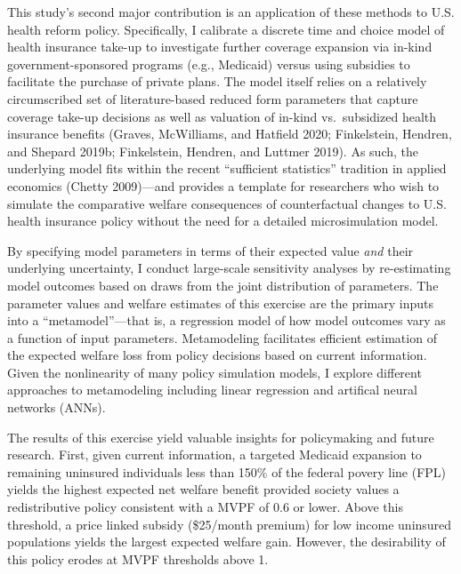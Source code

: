 \documentclass[
  10pt,
]{article}
\begin{document}
This study's second major contribution is an application of these
methods to U.S. health reform policy. Specifically, I calibrate a
discrete time and choice model of health insurance take-up to
investigate further coverage expansion via in-kind government-sponsored
programs (e.g., Medicaid) versus using subsidies to facilitate the
purchase of private plans. The model itself relies on a relatively
circumscribed set of literature-based reduced form parameters that
capture coverage take-up decisions as well as valuation of in-kind
vs.~subsidized health insurance benefits (Graves, McWilliams, and
Hatfield 2020; Finkelstein, Hendren, and Shepard 2019b; Finkelstein,
Hendren, and Luttmer 2019). As such, the underlying model fits within
the recent ``sufficient statistics'' tradition in applied economics
(Chetty 2009)---and provides a template for researchers who wish to
simulate the comparative welfare consequences of counterfactual changes
to U.S. health insurance policy without the need for a detailed
microsimulation model.

By specifying model parameters in terms of their expected value
\emph{and} their underlying uncertainty, I conduct large-scale
sensitivity analyses by re-estimating model outcomes based on draws from
the joint distribution of parameters. The parameter values and welfare
estimates of this exercise are the primary inputs into a
``metamodel''---that is, a regression model of how model outcomes vary
as a function of input parameters. Metamodeling facilitates efficient
estimation of the expected welfare loss from policy decisions based on
current information. Given the nonlinearity of many policy simulation
models, I explore different approaches to metamodeling including linear
regression and artifical neural networks (ANNs).

The results of this exercise yield valuable insights for policymaking
and future research. First, given current information, a targeted
Medicaid expansion to remaining uninsured individuals less than 150\% of
the federal povery line (FPL) yields the highest expected net welfare
benefit provided society values a redistributive policy consistent with
a MVPF of 0.6 or lower. Above this threshold, a price linked subsidy
(\$25/month premium) for low income uninsured populations yields the
largest expected welfare gain. However, the desirability of this policy
erodes at MVPF thresholds above 1.
\end{document}

